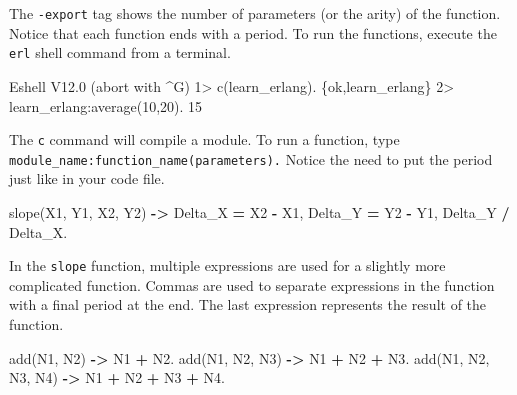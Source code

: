 \documentclass[
]{book}
\newenvironment{Shaded}{\begin{snugshade}}{\end{snugshade}}
\newcommand{\FunctionTok}[1]{\textcolor[rgb]{0.00,0.00,0.00}{#1}}
\newcommand{\NormalTok}[1]{#1}
\newcommand{\OperatorTok}[1]{\textcolor[rgb]{0.81,0.36,0.00}{\textbf{#1}}}
\newcommand{\VariableTok}[1]{\textcolor[rgb]{0.00,0.00,0.00}{#1}}
\begin{document}
The \texttt{-export} tag shows the number of parameters (or the arity) of the function. Notice that each function ends with a period. To run the functions, execute the \texttt{erl} shell command from a terminal.

\begin{Shaded}
\begin{Highlighting}[]
\NormalTok{Eshell V12.0  (abort with \^{}G)}
\NormalTok{1\textgreater{} c(learn\_erlang).}
\NormalTok{\{ok,learn\_erlang\}}
\NormalTok{2\textgreater{} learn\_erlang:average(10,20).}
\NormalTok{15}
\end{Highlighting}
\end{Shaded}

The \texttt{c} command will compile a module. To run a function, type \texttt{module\_name:function\_name(parameters).} Notice the need to put the period just like in your code file.

\begin{Shaded}
\begin{Highlighting}[]
\FunctionTok{slope(}\VariableTok{X1}\FunctionTok{,} \VariableTok{Y1}\FunctionTok{,} \VariableTok{X2}\FunctionTok{,} \VariableTok{Y2}\FunctionTok{)} \OperatorTok{{-}\textgreater{}}
   \VariableTok{Delta\_X} \OperatorTok{=} \VariableTok{X2} \OperatorTok{{-}} \VariableTok{X1}\FunctionTok{,}
   \VariableTok{Delta\_Y} \OperatorTok{=} \VariableTok{Y2} \OperatorTok{{-}} \VariableTok{Y1}\FunctionTok{,}
   \VariableTok{Delta\_Y} \OperatorTok{/} \VariableTok{Delta\_X}\FunctionTok{.}
\end{Highlighting}
\end{Shaded}

In the \texttt{slope} function, multiple expressions are used for a slightly more complicated function. Commas are used to separate expressions in the function with a final period at the end. The last expression represents the result of the function.

\begin{Shaded}
\begin{Highlighting}[]
\FunctionTok{add(}\VariableTok{N1}\FunctionTok{,} \VariableTok{N2}\FunctionTok{)} \OperatorTok{{-}\textgreater{}} \VariableTok{N1} \OperatorTok{+} \VariableTok{N2}\FunctionTok{.}
\FunctionTok{add(}\VariableTok{N1}\FunctionTok{,} \VariableTok{N2}\FunctionTok{,} \VariableTok{N3}\FunctionTok{)} \OperatorTok{{-}\textgreater{}} \VariableTok{N1} \OperatorTok{+} \VariableTok{N2} \OperatorTok{+} \VariableTok{N3}\FunctionTok{.}
\FunctionTok{add(}\VariableTok{N1}\FunctionTok{,} \VariableTok{N2}\FunctionTok{,} \VariableTok{N3}\FunctionTok{,} \VariableTok{N4}\FunctionTok{)} \OperatorTok{{-}\textgreater{}} \VariableTok{N1} \OperatorTok{+} \VariableTok{N2} \OperatorTok{+} \VariableTok{N3} \OperatorTok{+} \VariableTok{N4}\FunctionTok{.}
\end{Highlighting}
\end{Shaded}
\end{document}
